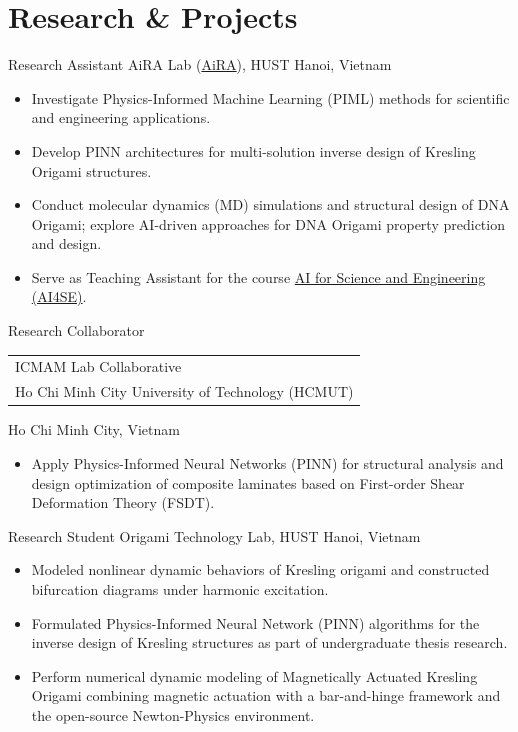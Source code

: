 \documentclass[11pt,a4paper,sans]{moderncv}
\begin{document}
\section{Research \& Projects}

        {Research Assistant}
        {AiRA Lab (\href{https://aira-hust.github.io/AiRA/}{AiRA}), HUST}
        {\textnormal{Hanoi, Vietnam}}
        {}
        {\begin{itemize}
        \item Investigate Physics-Informed Machine Learning (PIML) methods for scientific and engineering applications.
        \item Develop PINN architectures for multi-solution inverse design of Kresling Origami structures.
        \item Conduct molecular dynamics (MD) simulations and structural design of DNA Origami; explore AI-driven approaches for DNA Origami property prediction and design.
        \item Serve as Teaching Assistant for the course \href{https://github.com/AiRA-Laboratory/AI4SE}{AI for Science and Engineering (AI4SE)}.
        \end{itemize}}

        {Research Collaborator}
        {\begin{tabular}[t]{@{}l@{}}ICMAM Lab Collaborative\\Ho Chi Minh City University of Technology (HCMUT)\end{tabular}}
        {\textnormal{Ho Chi Minh City, Vietnam}}
        {}
        {\begin{itemize}
        \item Apply Physics-Informed Neural Networks (PINN) for structural analysis and design optimization of composite laminates based on First-order Shear Deformation Theory (FSDT).
        \end{itemize}}

        {Research Student}
        {Origami Technology Lab, HUST}
        {\textnormal{Hanoi, Vietnam}}
        {}
        {\begin{itemize}
        \item Modeled nonlinear dynamic behaviors of Kresling origami and constructed bifurcation diagrams under harmonic excitation.
        \item Formulated Physics-Informed Neural Network (PINN) algorithms for the inverse design of Kresling structures as part of undergraduate thesis research.
        \item Perform numerical dynamic modeling of Magnetically Actuated Kresling Origami combining magnetic actuation with a bar-and-hinge framework and the open-source Newton-Physics environment.
        \end{itemize}}
\end{document}
